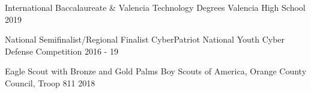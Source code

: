 



\begin{cvhonors}

  \cvhonor
    {International Baccalaureate \& Valencia Technology Degrees} %
    {Valencia High School} %
    {} %
    {2019} %

  \cvhonor
    {National Semifinalist/Regional Finalist} %
    {CyberPatriot National Youth Cyber Defense Competition} %
    {} %
    {2016 - 19} %
    
  \cvhonor
    {Eagle Scout with Bronze and Gold Palms} %
    {Boy Scouts of America, Orange County Council, Troop 811} %
    {} %
    {2018} %



\end{cvhonors}





